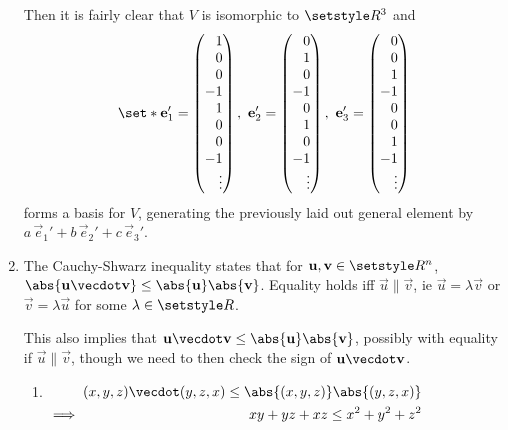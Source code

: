 \documentclass[fleqn,a4paper,11pt]{article}
\begin{document}
\begin{enumerate}[label=\textbf{\arabic*.}]
    Then it is fairly clear that \(V\) is isomorphic to \(\Reals^3\) and
    \begin{equation*}
     \set*{
      \vec e_1'
       =
       \begin{pmatrix*}[r]
        1 \\ 0 \\ 0 \\ -1 \\ 1 \\ 0 \\ 0 \\ -1 \\ \vdots
       \end{pmatrix*},
    \ \vec e_2'
       =
       \begin{pmatrix*}[r]
        0 \\ 1 \\ 0 \\ -1 \\ 0 \\ 1 \\ 0 \\ -1 \\ \vdots
       \end{pmatrix*},
    \ \vec e_3'
       =
       \begin{pmatrix*}[r]
        0 \\ 0 \\ 1 \\ -1 \\ 0 \\ 0 \\ 1 \\ -1 \\ \vdots
       \end{pmatrix*}
      }
    \end{equation*}
    forms a basis for \(V\), generating the previously laid out general element
    by \(a\,\vec e_1' + b\,\vec e_2' + c\,\vec e_3'\).
   \item
    The Cauchy-Shwarz inequality states that for
    \(\vec u, \vec v \in \Reals^n\),
    \(\abs{\vec u \vecdot \vec v} \le \abs{\vec u} \abs{\vec v}\).
    Equality holds iff \(\vec u \parallel \vec v\), ie
    \(\vec u = \lambda \vec v\) or \(\vec v = \lambda \vec u\) for some
    \(\lambda \in \Reals\).

    This also implies that
    \(\vec u \vecdot \vec v \le \abs{\vec u} \abs{\vec v}\),
    possibly with equality if \(\vec u \parallel \vec v\), though we need to
    then check the sign of \(\vec u \vecdot \vec v\).
    \begin{enumerate}[label=(\alph*)]
     \item \(
      \begin{alignedat}[t]2
       && (x, y, z) \vecdot (y, z, x) \le \abs{(x, y, z)} \abs{(y, z, x)} \\
       \implies{}&& xy + yz + xz \le x^2 + y^2 + z^2
      \end{alignedat} \)


\end{enumerate}
\end{enumerate}
\end{document}
